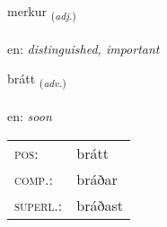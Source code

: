 \documentclass[frontgrid, backgrid]{flacards}\usepackage[]{graphicx}\usepackage[]{xcolor}
\begin{document}
\renewcommand{\flhead}{\vskip5pt \fboxsep=0pt {\small\bfseries\footnotesize Lýsingarorð | Adjective}}
\renewcommand{\fcfoot}{\vskip5pt \fboxsep=0pt \hspace{2pt}{\small\bfseries\footnotesize 3K}}

\renewcommand{\blhead}{\vskip5pt {\small\bfseries\footnotesize Lýsingarorð | Adjective }}
\renewcommand{\bcfoot}{\vskip5pt \hspace{2pt}{\small\bfseries\footnotesize 3K}}


{merkur \small{\textsubscript{(\textit{adj.})}} \\[1ex] %
 \\
en: \emph{distinguished, important} \\  [2ex]
\renewcommand*{\arraystretch}{0.8}
}

\renewcommand{\flhead}{\vskip5pt \fboxsep=0pt {\small\bfseries\footnotesize Atviksorð | Adverb}}
\renewcommand{\fcfoot}{\vskip5pt \fboxsep=0pt \hspace{2pt}{\small\bfseries\footnotesize 3K}}

\renewcommand{\blhead}{\vskip5pt {\small\bfseries\footnotesize Atviksorð | Adverb }}
\renewcommand{\bcfoot}{\vskip5pt \hspace{2pt}{\small\bfseries\footnotesize 3K}}


{brátt \small{\textsubscript{(\textit{adv.})}} \\[1ex] %
\textphonetic{[prauht]} \\
en: \emph{soon} \\  [2ex]
\renewcommand*{\arraystretch}{0.8}
\begin{tabular}{ll}
\textsc{pos}: & brátt \\ 
\textsc{comp.}: & bráðar \\ 
\textsc{superl.}: & bráðast \\
\end{tabular}
}
\end{document}
